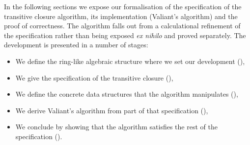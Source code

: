 \documentclass{CSML}
\numberwithin{theorem}{section}
\begin{document}
In the following sections we expose our formalisation of the
specification of the transitive closure algorithm, its implementation
(Valiant's algorithm) and the proof of correctness.
The algorithm falls out from a calculational refinement of the specification
rather than being exposed \textit{ex nihilo} and proved separately.
The development is presented in a number of stages:
\begin{itemize}
\item We define the ring-like algebraic structure where we set our
  development (),

\item We give the specification of the transitive closure
  (),

\item We define the concrete data structures that the algorithm
  manipulates (),

\item We derive Valiant's algorithm from part of that specification
  (), 

\item We conclude by showing that the algorithm satisfies the rest of
  the specification ().
\end{itemize}
\providecommand{\structure}[2]{C#1 & \ref{structure:#1}  & #2 & \pageref{structure:#1}}
\end{document}
